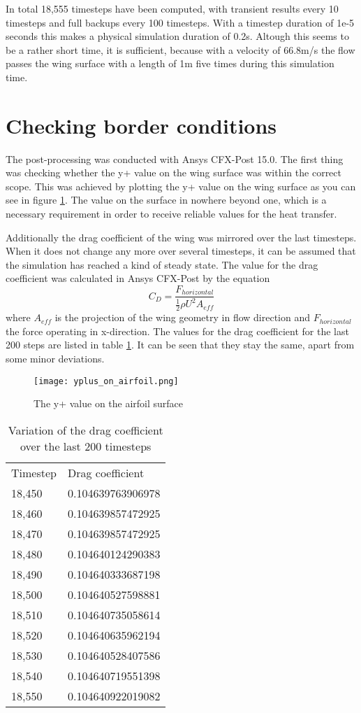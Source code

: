 In total 18,555 timesteps have been computed, with transient results every 10 timesteps and full backups every 100 timesteps. With a timestep duration of 1e-5 seconds this makes a physical simulation duration of 0.2s. Altough this seems to be a rather short time, it is sufficient, because with a velocity of 66.8m/s the flow passes the wing surface with a length of 1m five times during this simulation time.
\section{Checking border conditions}
The post-processing was conducted with Ansys CFX-Post 15.0. The first thing was checking whether the y+ value on the wing surface was within the correct scope. This was achieved by plotting the y+ value on the wing surface as you can see in figure \ref{fig:yplus}. The value on the surface in nowhere beyond one, which is a necessary requirement in order to receive reliable values for the heat transfer.

Additionally the drag coefficient of the wing was mirrored over the last timesteps. When it does not change any more over several timesteps, it can be assumed that the simulation has reached a kind of steady state. The value for the drag coefficient was calculated in Ansys CFX-Post by the equation
\begin{equation}
C_D = \frac{F_{horizontal}}{\frac{1}{2} \rho U^2 A_{eff}}
\end{equation}
where $A_{eff}$ is the projection of the wing geometry in flow direction and $F_{horizontal}$ the force operating in x-direction.
The values for the drag coefficient for the last 200 steps are listed in table \ref{tab:htc_values}. It can be seen that they stay the same, apart from some minor deviations.
\begin{figure}[h]
\centering
\texttt{[image: yplus\_on\_airfoil.png]}
\caption{The y+ value on the airfoil surface}
\label{fig:yplus}
\end{figure}

\begin{table}[h]
\centering
\caption{Variation of the drag coefficient over the last 200 timesteps}
\label{tab:htc_values}
\begin{tabular}{ll}
Timestep&Drag coefficient\\
18,450&0.104639763906978\\
18,460&0.104639857472925\\
18,470&0.104639857472925\\
18,480&0.104640124290383\\
18,490&0.104640333687198\\
18,500&0.104640527598881\\
18,510&0.104640735058614\\
18,520&0.104640635962194\\
18,530&0.104640528407586\\
18,540&0.104640719551398\\
18,550&0.104640922019082\\
\end{tabular}
\end{table}

